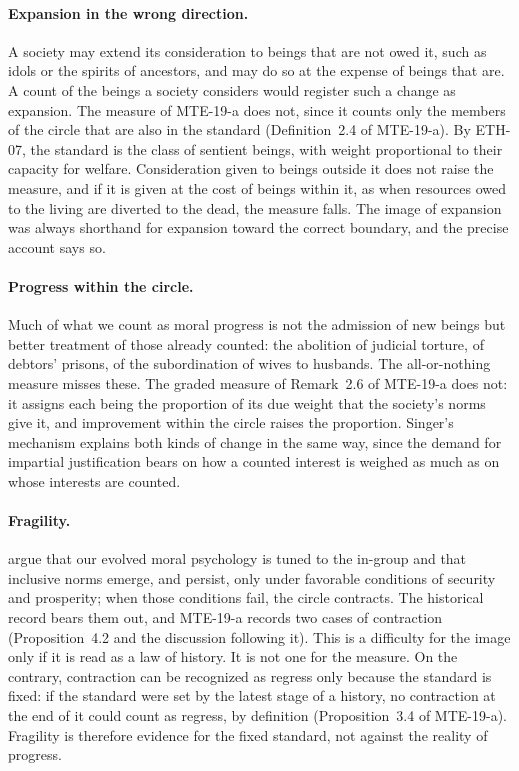 \documentclass{situationist-preprint}
\begin{document}
\paragraph{Expansion in the wrong direction.} A society may extend its consideration to beings that are not owed it, such as idols or the spirits of ancestors, and may do so at the expense of beings that are. A count of the beings a society considers would register such a change as expansion. The measure of MTE-19-a does not, since it counts only the members of the circle that are also in the standard (Definition~2.4 of MTE-19-a). By ETH-07, the standard is the class of sentient beings, with weight proportional to their capacity for welfare. Consideration given to beings outside it does not raise the measure, and if it is given at the cost of beings within it, as when resources owed to the living are diverted to the dead, the measure falls. The image of expansion was always shorthand for expansion toward the correct boundary, and the precise account says so.

\paragraph{Progress within the circle.} Much of what we count as moral progress is not the admission of new beings but better treatment of those already counted: the abolition of judicial torture, of debtors' prisons, of the subordination of wives to husbands. The all-or-nothing measure misses these. The graded measure of Remark~2.6 of MTE-19-a does not: it assigns each being the proportion of its due weight that the society's norms give it, and improvement within the circle raises the proportion. Singer's mechanism explains both kinds of change in the same way, since the demand for impartial justification bears on how a counted interest is weighed as much as on whose interests are counted.

\paragraph{Fragility.} \citet{BuchananPowell2018} argue that our evolved moral psychology is tuned to the in-group and that inclusive norms emerge, and persist, only under favorable conditions of security and prosperity; when those conditions fail, the circle contracts. The historical record bears them out, and MTE-19-a records two cases of contraction (Proposition~4.2 and the discussion following it). This is a difficulty for the image only if it is read as a law of history. It is not one for the measure. On the contrary, contraction can be recognized as regress only because the standard is fixed: if the standard were set by the latest stage of a history, no contraction at the end of it could count as regress, by definition (Proposition~3.4 of MTE-19-a). Fragility is therefore evidence for the fixed standard, not against the reality of progress.
\end{document}
